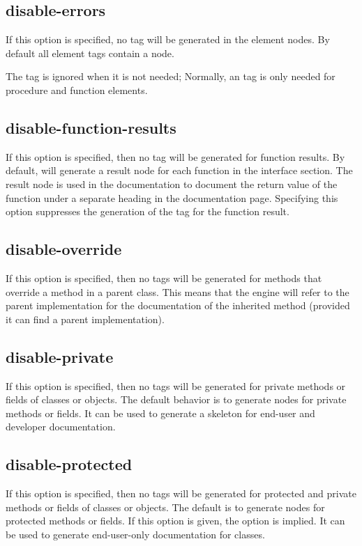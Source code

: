 \subsection{disable-errors}
\label{suse:msdisableerrors}
If this option is specified, no  tag will be generated in the
element nodes. By default all element tags contain a  node.

The  tag is ignored when it is not needed; Normally, an 
 tag is only needed for procedure and function elements.

\subsection{disable-function-results}
\label{suse:disablefunctionresults}
If this option is specified, then no  tag will be generated for
function results. By default,  will generate a result node
for each function in the interface section. The result node is used in the
documentation to document the return value of the function under a separate
heading in the documentation page. Specifying this option suppresses the
generation of the  tag for the function result.

\subsection{disable-override}
\label{suse:disableoverride}
If this option is specified, then no  tags will be generated
for methods that override a method in a parent class. This means that the
 engine will refer to the parent implementation for the documentation
of the inherited method (provided it can find a parent implementation).


\subsection{disable-private}
\label{suse:disableprivate}
If this option is specified, then no  tags will be generated
for private methods or fields of classes or objects. 
The default behavior is to generate nodes for private methods or fields.
It can be used to generate a skeleton for end-user and developer
documentation.

\subsection{disable-protected}
\label{suse:disableprotected}
If this option is specified, then no  tags will be generated
for protected and private methods or fields of classes or objects. 
The default is to generate nodes for protected methods or fields. If this
option is given, the option  is implied. It can be
used to generate end-user-only documentation for classes. 


